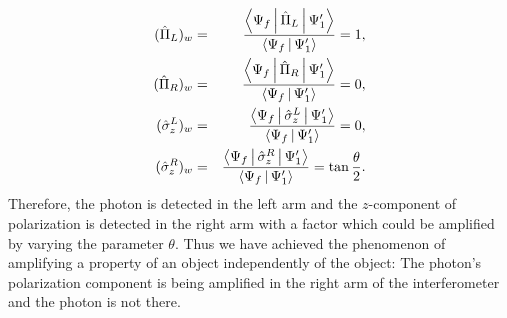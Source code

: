 \documentclass[aps,pra,showpacs,twoside,twocolumn,10pt]{revtex4-1}
\begin{document}
\begin{eqnarray}
(\hat{\Pi}_L)_w&=&\frac{\Braket{\Psi_f|\hat{\Pi}_L|\Psi^\prime_1}}{\Braket{\Psi_f|\Psi^\prime_1}}=1,\nonumber\\
(\hat{\Pi}_R)_w&=&\frac{\Braket{\Psi_f|\hat{\Pi}_R|\Psi^\prime_1}}{\Braket{\Psi_f|\Psi^\prime_1}}=0,\nonumber\\
(\hat{\sigma}_z^{L})_w&=&\frac{\Braket{\Psi_f|\hat{\sigma}_z^{L}|\Psi^\prime_1}}{{\Braket{\Psi_f|\Psi^\prime_1}}}=0,\nonumber\\
(\hat{\sigma}_z^{R})_w&=&\frac{\Braket{\Psi_f|\hat{\sigma}_z^{R}|\Psi^\prime_1}}{\Braket{\Psi_f|\Psi^\prime_1}}=\tan\frac{\theta}{2}.
\label{eq:7}
\end{eqnarray}
Therefore, the photon is detected in the left arm and the $z$-component of polarization is detected in the right arm with a factor which could be amplified by varying the parameter $\theta$. Thus we have achieved the phenomenon of amplifying a property of an object independently of the object: The photon's  polarization component is being amplified in the right arm of the interferometer and the photon is not there.
\end{document}
